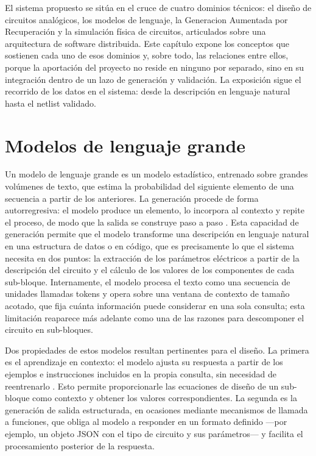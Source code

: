 
El sistema propuesto se sitúa en el cruce de cuatro dominios técnicos: el diseño de circuitos analógicos, los modelos de lenguaje, la Generacion Aumentada por Recuperación y la simulación física de circuitos, articulados sobre una arquitectura de software distribuida. Este capítulo expone los conceptos que sostienen cada uno de esos dominios y, sobre todo, las relaciones entre ellos, porque la aportación del proyecto no reside en ninguno por separado, sino en su integración dentro de un lazo de generación y validación. La exposición sigue el recorrido de los datos en el sistema: desde la descripción en lenguaje natural hasta el netlist validado.

\section{Modelos de lenguaje grande}

Un modelo de lenguaje grande es un modelo estadístico, entrenado sobre grandes volúmenes de texto, que estima la probabilidad del siguiente elemento de una secuencia a partir de los anteriores. La generación procede de forma autorregresiva: el modelo produce un elemento, lo incorpora al contexto y repite el proceso, de modo que la salida se construye paso a paso \cite{vaswani2017attention}. Esta capacidad de generación permite que el modelo transforme una descripción en lenguaje natural en una estructura de datos o en código, que es precisamente lo que el sistema necesita en dos puntos: la extracción de los parámetros eléctricos a partir de la descripción del circuito y el cálculo de los valores de los componentes de cada sub-bloque. Internamente, el modelo procesa el texto como una secuencia de unidades llamadas tokens y opera sobre una ventana de contexto de tamaño acotado, que fija cuánta información puede considerar en una sola consulta; esta limitación reaparece más adelante como una de las razones para descomponer el circuito en sub-bloques.

Dos propiedades de estos modelos resultan pertinentes para el diseño. La primera es el aprendizaje en contexto: el modelo ajusta su respuesta a partir de los ejemplos e instrucciones incluidos en la propia consulta, sin necesidad de reentrenarlo \cite{brown2020language}. Esto permite proporcionarle las ecuaciones de diseño de un sub-bloque como contexto y obtener los valores correspondientes. La segunda es la generación de salida estructurada, en ocasiones mediante mecanismos de llamada a funciones, que obliga al modelo a responder en un formato definido ---por ejemplo, un objeto JSON con el tipo de circuito y sus parámetros--- y facilita el procesamiento posterior de la respuesta.


